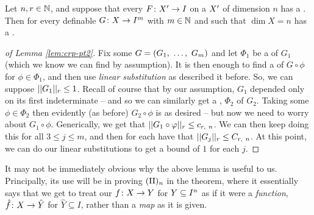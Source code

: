 \begin{lemma}
  Let $n, r \in \N$, and suppose that every $\funcdom{F}{\pri{X}}{I}$  on a  $\pri{X}$ of dimension $n$ has a \cellrparam. Then for every definable $\funcdom{G}{X}{I^m}$ with $m \in \N$ and such that $\dim{X} = n$ has a \cellrparam.
  \label{lem:crp-pt2}
\end{lemma}

\begin{proof}[of Lemma \ref{lem:crp-pt2}]
  Fix some $G = (\vonevm{G}{m})$ and let $\Phi_1$ be a \cellrparam of $G_1$ (which we know we can find by assumption). It is then enough to find a \cellrparam of $G \circ \phi$ for $\phi \in \Phi_1$, and then use \emph{linear substitution} as described it before. So, we can suppose $\rnorm{G_1} \leq 1$. Recall of course that by our assumption, $G_1$ depended only on its first indeterminate -- and so we can similarly get a \cellrparam, $\Phi_2$ of $G_2$. Taking some $\phi \in \Phi_2$ then evidently (as before) $G_2 \circ \phi$ is as desired -- but now we need to worry about $G_1 \circ \phi$. Generically, we get that $\rnorm{G_1 \circ \phi} \leq c_{r, \ n}$. We can then keep doing this for all $3 \leq j \leq m$, and then for each have that $\rnorm{G_j} \leq C_{r, \ n}$. At this point, we can do our linear substitutions to get a bound of $1$ for each $j$.
\end{proof}

\begin{remark}
  It may not be immediately obvious why the above lemma is useful to us. Principally, its use will be in proving $\IIn$ in the theorem, where it essentially says that we get to treat our $\funcdom{f}{X}{Y}$ for $\CIn[Y]{n}$ as if it were a \emph{function}, $\funcdom{\hat{f}}{X}{\hat{Y}}$ for $\hat{Y} \subseteq I$, rather than a \emph{map} as it is given.
\end{remark}

